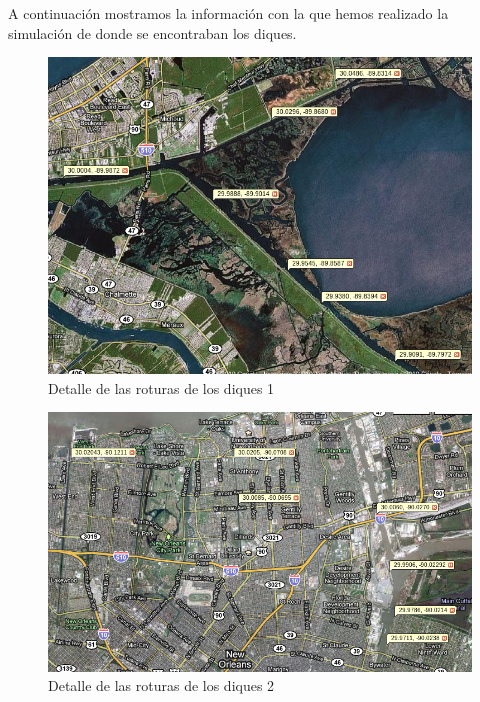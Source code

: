A continuación mostramos la información con la que hemos realizado la
simulación de donde se encontraban los diques.


\begin{figure}[H]
 \centering
 \includegraphics[width=135mm]{figuras/cap6/dikes1.png}
 \caption{Detalle de las roturas de los diques 1}
\end{figure}


\begin{figure}[H]
 \centering
 \includegraphics[width=140mm]{figuras/cap6/dikes2.png}
 \caption{Detalle de las roturas de los diques 2}
\end{figure}


